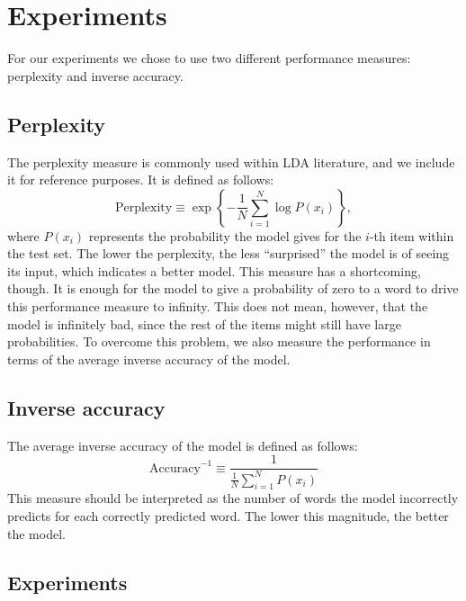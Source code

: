 \documentclass[a4paper,10pt]{article}
\begin{document}
\section{Experiments}

For our experiments we chose to use two different performance measures: perplexity and inverse accuracy.

\subsection{Perplexity}

The perplexity measure is commonly used within LDA literature, and we include it for reference purposes. 
It is defined as follows:
\begin{equation}
\text{Perplexity} \equiv \exp \left\{ -\frac{1}{N} \sum_{i = 1}^N \log P(x_i)  \right\},
\end{equation}
where \(P(x_i)\) represents the probability the model gives for the $i$-th item within the test set. The lower the perplexity, the less ``surprised'' the model is of seeing its input, which indicates a better model.
This measure has a shortcoming, though. 
It is enough for the model to give a probability of zero to a word to drive this performance measure to infinity. 
This does not mean, however, that the model is infinitely bad, since the rest of the items might still have large probabilities.
To overcome this problem, we also measure the performance in terms of the average inverse accuracy of the model.

\subsection{Inverse accuracy}

The average inverse accuracy of the model is defined as follows:
\begin{equation}
\text{Accuracy}^{-1} \equiv \frac{1}{\frac{1}{N}\sum_{i = 1}^N P(x_i)}
\end{equation}
This measure should be interpreted as the number of words the model incorrectly predicts for each correctly predicted word. 
The lower this magnitude, the better the model.

\subsection{Experiments}
\end{document}
